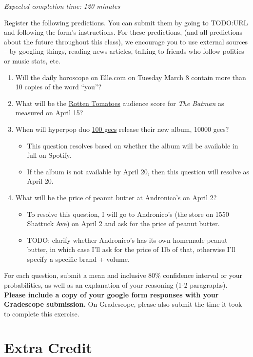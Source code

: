 \documentclass[11pt]{article}
\begin{document}
\emph{Expected completion time: 120 minutes}

Register the following predictions. You can submit them by going to TODO:URL and following the form's instructions. For these predictions, (and all predictions about the future throughout this class), we encourage you to use external sources -- by googling things, reading news articles, talking to friends who follow politics or music stats, etc.

\begin{enumerate}
	\item Will the daily horoscope on Elle.com on Tuesday March 8 contain more than 10 copies of the word ``you''?
	\item What will be the \href{https://www.rottentomatoes.com/m/the_batman}{Rotten Tomatoes} audience score for \emph{The Batman} as measured on April 15?
	\item When will hyperpop duo \href{https://en.wikipedia.org/wiki/100_Gecs}{100 gecs} release their new album, 10000 gecs?
	\begin{itemize}
		\item This question resolves based on whether the album will be available in full on Spotify.
		\item If the album is not available by April 20, then this question will resolve as April 20.
	\end{itemize}
	\item What will be the price of peanut butter at Andronico's on April 2?
	\begin{itemize}
		\item To resolve this question, I will go to Andronico's (the store on 1550 Shattuck Ave) on April 2 and ask for the price of peanut butter.
		\item TODO: clarify whether Andronico's has its own homemade peanut butter, in which case I'll ask for the price of 1lb of that, otherwise I'll specify a specific brand + volume.
	\end{itemize}
\end{enumerate}

For each question, submit a mean and inclusive 80\% confidence interval or your probabilities, as well as an explanation of your reasoning (1-2 paragraphs). \textbf{Please include a copy of your google form responses with your Gradescope submission.} On Gradescope, please also submit the time it took to complete this exercise.

\section*{Extra Credit}
\end{document}

